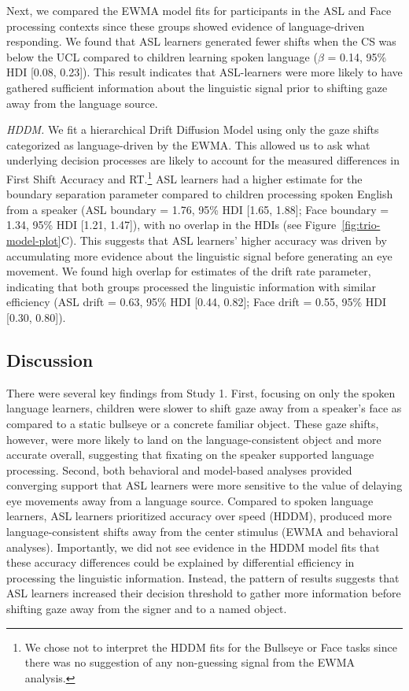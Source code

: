 \documentclass[,man,floatsintext]{apa6}
\let\rmarkdownfootnote\footnote%
\def\footnote{\protect\rmarkdownfootnote}
\begin{document}
Next, we compared the EWMA model fits for participants in the ASL and Face processing contexts since these groups showed evidence of language-driven responding. We found that ASL learners generated fewer shifts when the CS was below the UCL compared to children learning spoken language (\(\beta\) = 0.14, 95\% HDI {[}0.08, 0.23{]}). This result indicates that ASL-learners were more likely to have gathered sufficient information about the linguistic signal prior to shifting gaze away from the language source.

\emph{HDDM.} We fit a hierarchical Drift Diffusion Model using only the gaze shifts categorized as language-driven by the EWMA. This allowed us to ask what underlying decision processes are likely to account for the measured differences in First Shift Accuracy and RT.\footnote{We chose not to interpret the HDDM fits for the Bullseye or Face tasks since there was no suggestion of any non-guessing signal from the EWMA analysis.} ASL learners had a higher estimate for the boundary separation parameter compared to children processing spoken English from a speaker (ASL boundary = 1.76, 95\% HDI {[}1.65, 1.88{]}; Face boundary = 1.34, 95\% HDI {[}1.21, 1.47{]}), with no overlap in the HDIs (see Figure~\ref{fig:trio-model-plot}C). This suggests that ASL learners' higher accuracy was driven by accumulating more evidence about the linguistic signal before generating an eye movement. We found high overlap for estimates of the drift rate parameter, indicating that both groups processed the linguistic information with similar efficiency (ASL drift = 0.63, 95\% HDI {[}0.44, 0.82{]}; Face drift = 0.55, 95\% HDI {[}0.30, 0.80{]}).

\hypertarget{discussion}{%
\subsection{Discussion}\label{discussion}}

There were several key findings from Study 1. First, focusing on only the spoken language learners, children were slower to shift gaze away from a speaker's face as compared to a static bullseye or a concrete familiar object. These gaze shifts, however, were more likely to land on the language-consistent object and more accurate overall, suggesting that fixating on the speaker supported language processing. Second, both behavioral and model-based analyses provided converging support that ASL learners were more sensitive to the value of delaying eye movements away from a language source. Compared to spoken language learners, ASL learners prioritized accuracy over speed (HDDM), produced more language-consistent shifts away from the center stimulus (EWMA and behavioral analyses). Importantly, we did not see evidence in the HDDM model fits that these accuracy differences could be explained by differential efficiency in processing the linguistic information. Instead, the pattern of results suggests that ASL learners increased their decision threshold to gather more information before shifting gaze away from the signer and to a named object.
\end{document}
